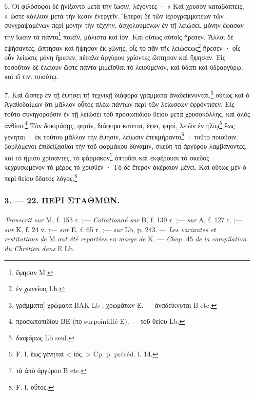 \documentclass[a4paper, 11pt, oneside, polutonikogreek, french]{article}
\begin{document}
6. Οἱ φιλόσοφοι δὲ ᾐνίξαντο μετὰ τὴν ἴωσιν, λέγοντες · « Καὶ χρυσὸν καταβάπτεις, » ὥστε κάλλιον μετὰ τὴν ἴωσιν ἐνεργεῖν. Ἕτεροι δὲ τῶν ἱερογραμματέων τῶν συγγραψαμένων περὶ μόνην τὴν τέχνην, ἀσχολουμένων ἐν τῇ λειώσει, μόνην ἔφασαν τὴν ἴωσιν τὰ πάντα\footnote{ἔφησαν M.} ποιεῖν, μάλιστα καὶ ἰόν. Καὶ οὕτως αὐτοῖς ἤρεσεν. Ἄλλοι δὲ ἑψήσαντες, ὤπτησαν καὶ ἥψησαν ἐκ χώνης, οἷς τὸ πᾶν τῆς λειώσεως\footnote{ἐν χωνείοις l.b.} ἤρεσεν · οἷς οὖν λείωσις μόνη ἤρεσεν, πέταλα ἀργύρου χρίοντες ὤπτησαν καὶ ἥψησαν. Εἰς τοσοῦτον δὲ ἐλείουν ὥστε πάντα μιμεῖσθαι τὸ λειούμενον, καὶ ὕδατι καὶ ὑδραργύρῳ, καὶ εἴ τινι τοιούτῳ.

7. Καὶ ὥσπερ ἐν τῇ ἑψήσει τῇ τεχνικῇ διάφορα γράμματα ἀναδείκνυνται,\footnote{γράμματα] χρώματα BAK Lb ; χρωμάτων E. --- ἀναδείκνυται B etc.} οὕτως καὶ ὁ Ἀγαθοδαίμων ὅτι μᾶλλον οὗτος πλέω πάντων περὶ τῶν λείωσεων ἐφρόντισεν. Εἰς τοῦτο συνηγοροῦσιν ἐν τῇ λειώσει τοῦ προσωπιδίου θείου μετὰ χρυσοκόλλης, καὶ ἀλὸς ἀνθίου.\footnote{προσωποπιδίου BE (πο surpointillé E). --- τοῦ θείου Lb.} Ἐὰν δοκιμάσῃς, φησὶν, διάφορα καίεται, ἕψει, φησὶ, λειῶν ἐν ἡλίῳ\footnote{διαφόρως Lb seul.} ἕως γένηται · ἐκ τούτου μᾶλλον τὴν ἕψησιν, λείωσιν ἐτεκμήραντο\footnote{F. l. ἕως γένηται < ἰός. > Cp. p. précéd. l. 14.} · τοῦτο ποιοῦσιν, βουλόμενοι ἐπιδείξασθαι τὴν τοῦ φαρμάκου δύναμιν, σκεύη τὰ ἀργύρου λαμβάνοντες, καὶ τὸ ἥμισυ χρίσαντες, τὸ φάρμακον\footnote{τὰ ἀπὸ ἀργύρου B etc.} ὀπτοῦσι καὶ ἐκφέρουσι τὸ σκεῦος κεχρυσωμένον τὸ μέρος τὸ χρισθέν · Τὸ δὲ ἕτερον ἀκέραιον μένει. Καὶ οὕτως μὲν ὁ περί θείου ὕδατος λόγος.\footnote{F. l. οὗτος.}

\bigskip
\centerline{\EightStarTaper}
\centerline{\EightStarTaper\EightStarTaper}
\bigskip

\subsubsection{3. --- 22. ΠΕΡΙ ΣΤΑΘΜΩΝ.}
\paragraph{}
\emph{Transcrit sur} M, f. 153 r. ;--- \emph{Collationné sur} B, f. 139 r. ;--- \emph{sur} A, f. 127 r. ;--- \emph{sur} K, f. 24 v. ;--- \emph{sur} E, f. 65 r. ;--- \emph{sur} Lb, p. 243. --- \emph{Les variantes et restitutions de} M \emph{ont été reportées en marge de} K. --- \emph{Chap.} 45 \emph{de la compilation du Chrétien dans} E Lb.

\bigskip
\end{document}

